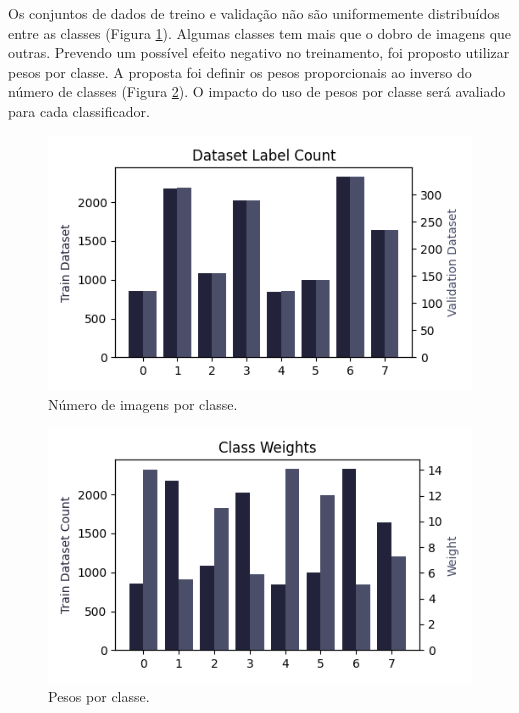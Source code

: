 \documentclass[final,5p]{elsarticle}
\numberwithin{equation}{section}
\begin{document}
    Os conjuntos de dados de treino e validação não são uniformemente distribuídos entre as classes (Figura \ref{fig:AmostrasContagem}). Algumas classes tem mais que o dobro de imagens que outras. Prevendo um possível efeito negativo no treinamento, foi proposto utilizar pesos por classe. A proposta foi definir os pesos proporcionais ao inverso do número de classes (Figura \ref{fig:AmostrasPesos}). O impacto do uso de pesos por classe será avaliado para cada classificador.

        \begin{figure}[hbt!]
            \includegraphics[width=0.95\columnwidth]{Samples_count.png}
            \caption{Número de imagens por classe.}\label{fig:AmostrasContagem}
        \end{figure}

        \begin{figure}[hbt!]
            \includegraphics[width=0.95\columnwidth]{Samples_weights.png}
            \caption{Pesos por classe.}\label{fig:AmostrasPesos}
        \end{figure}
\end{document}

